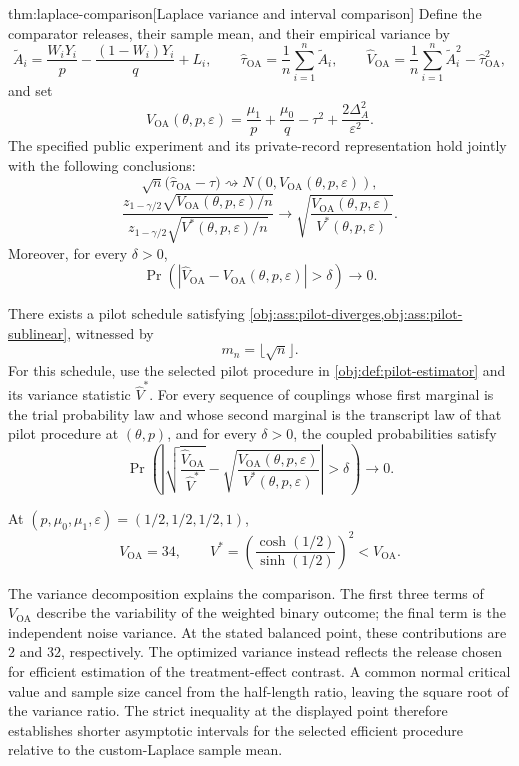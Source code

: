 \begin{theoremv}{thm:laplace-comparison}[Laplace variance and interval comparison]
Define the comparator releases, their sample mean, and their empirical variance by
\[
\widetilde A_i
=\frac{W_iY_i}{p}-\frac{(1-W_i)Y_i}{q}+L_i,
\qquad
\widehat\tau_{\mathrm{OA}}
=\frac1n\sum_{i=1}^n\widetilde A_i,
\qquad
\widehat V_{\mathrm{OA}}
=\frac1n\sum_{i=1}^n\widetilde A_i^2
-\widehat\tau_{\mathrm{OA}}^2,
\]
and set
\[
V_{\mathrm{OA}}(\theta,p,\varepsilon)
=\frac{\mu_1}{p}+\frac{\mu_0}{q}-\tau^2
+\frac{2\Delta_A^2}{\varepsilon^2}.
\]
The specified public experiment and its private-record representation hold jointly with the following conclusions:
\[
\sqrt n\bigl(\widehat\tau_{\mathrm{OA}}-\tau\bigr)
\rightsquigarrow
N\!\left(0,V_{\mathrm{OA}}(\theta,p,\varepsilon)\right),
\]
\[
\frac{z_{1-\gamma/2}\sqrt{V_{\mathrm{OA}}(\theta,p,\varepsilon)/n}}
     {z_{1-\gamma/2}\sqrt{V^*(\theta,p,\varepsilon)/n}}
\longrightarrow
\sqrt{\frac{V_{\mathrm{OA}}(\theta,p,\varepsilon)}
           {V^*(\theta,p,\varepsilon)}}.
\]
Moreover, for every \(\delta>0\),
\[
\Pr\!\left(
\left|\widehat V_{\mathrm{OA}}
      -V_{\mathrm{OA}}(\theta,p,\varepsilon)\right|>\delta
\right)\longrightarrow0.
\]

There exists a pilot schedule satisfying
\cref{obj:ass:pilot-diverges,obj:ass:pilot-sublinear}, witnessed by
\[
m_n=\lfloor\sqrt n\rfloor.
\]
For this schedule, use the selected pilot procedure in
\cref{obj:def:pilot-estimator} and its variance statistic \(\widehat V^*\).
For every sequence of couplings whose first marginal is the trial probability law and whose second marginal is the transcript law of that pilot procedure at \((\theta,p)\), and for every \(\delta>0\), the coupled probabilities satisfy
\[
\Pr\!\left(
\left|
\sqrt{\frac{\widehat V_{\mathrm{OA}}}{\widehat V^*}}
-\sqrt{\frac{V_{\mathrm{OA}}(\theta,p,\varepsilon)}
             {V^*(\theta,p,\varepsilon)}}
\right|>\delta
\right)\longrightarrow0.
\]

At \((p,\mu_0,\mu_1,\varepsilon)=(1/2,1/2,1/2,1)\),
\[
V_{\mathrm{OA}}=34,
\qquad
V^*=\left(\frac{\cosh(1/2)}{\sinh(1/2)}\right)^2
< V_{\mathrm{OA}}.
\]
\end{theoremv}

The variance decomposition explains the comparison. The first three terms of \(V_{\mathrm{OA}}\) describe the variability of the weighted binary outcome; the final term is the independent noise variance. At the stated balanced point, these contributions are \(2\) and \(32\), respectively. The optimized variance instead reflects the release chosen for efficient estimation of the treatment-effect contrast. A common normal critical value  and sample size cancel from the half-length ratio, leaving the square root of the variance ratio. The strict inequality at the displayed point therefore establishes shorter asymptotic intervals for the selected efficient procedure relative to the custom-Laplace sample mean.

